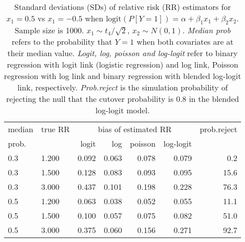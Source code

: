 \documentclass[12pt,a4paper]{article}
\begin{document}
\begin{table}[H] 
\small\sf\centering 
\caption{Standard deviations (SDs) of relative risk (RR) estimators for $x_1=0.5$ vs $x_1=-0.5$ when $\mbox{logit}(P[Y=1])=\alpha+\beta_1 x_1 + \beta_2 x_2$. Sample size is 1000. $x_1 \sim $$t_4/\sqrt{2}$, $x_2 \sim N(0,1)$. {\it Median prob} refers to the probability that $Y=1$ when both covariates are at their median value. {\it Logit, log, poisson and log-logit} refer to binary regression with logit link (logistic regression) and log link, Poisson regression with log link and binary regression with blended log-logit link, respectively. {\it Prob.reject} is the simulation probability of rejecting the null that the cutover probability is $0.8$ in the blended log-logit model.} 
\begin{tabular}{llrrrrr} 
\toprule 
median & true RR & \multicolumn{4}{c}{bias of estimated RR} & prob.reject \\ 
prob. & & logit & log & poisson & log-logit  & \\ \midrule 
0.3 & 1.200 & 0.092 & 0.063 & 0.078 & 0.079 &  0.2 \\  
0.3 & 1.500 & 0.128 & 0.083 & 0.093 & 0.095 & 15.6 \\  
0.3 & 3.000 & 0.437 & 0.101 & 0.198 & 0.228 & 76.3 \\  
0.5 & 1.200 & 0.063 & 0.038 & 0.052 & 0.055 & 11.1 \\  
0.5 & 1.500 & 0.100 & 0.057 & 0.075 & 0.082 & 51.0 \\  
0.5 & 3.000 & 0.375 & 0.060 & 0.156 & 0.271 & 92.7 \\  
\bottomrule 
\end{tabular} 
\end{table} 
\end{document}
